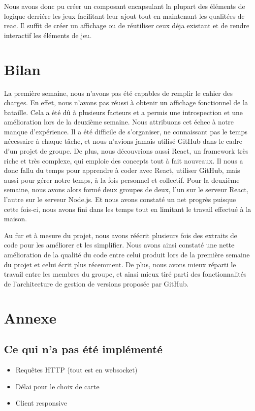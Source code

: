 \documentclass[a4paper]{article}
\begin{document}
Nous avons donc pu créer un composant encapsulant la plupart des éléments de logique derriére les jeux facilitant leur ajout tout en maintenant les qualitées de reac. Il suffit de créer un affichage ou de réutiliser ceux déja existant et de rendre interactif les éléments de jeu.





\section{Bilan}

La première semaine, nous n'avons pas été capables de remplir le cahier des charges. En effet, nous n'avons pas réussi à obtenir un affichage fonctionnel de la bataille. Cela a été dû à plusieurs facteurs et a permis une introspection et une amélioration lors de la deuxième semaine. Nous attribuons cet échec à notre manque d'expérience. Il a été difficile de s'organiser, ne connaissant pas le temps nécessaire à chaque tâche, et nous n'avions jamais utilisé GitHub dans le cadre d'un projet de groupe. De plus, nous découvrions aussi React, un framework très riche et très complexe, qui emploie des concepts tout à fait nouveaux. Il nous a donc fallu du temps pour apprendre à coder avec React, utiliser GitHub, mais aussi pour gérer notre temps, à la fois personnel et collectif. Pour la deuxième semaine, nous avons alors formé deux groupes de deux, l'un sur le serveur React, l'autre sur le serveur Node.js. Et nous avons constaté un net progrès puisque cette fois-ci, nous avons fini dans les temps tout en limitant le travail effectué à la maison.

Au fur et à mesure du projet, nous avons réécrit plusieurs fois des extraits de code pour les améliorer et les simplifier. Nous avons ainsi constaté une nette amélioration de la qualité du code entre celui produit lors de la première semaine du projet et celui écrit plus récemment. De plus, nous avons mieux réparti le travail entre les membres du groupe, et ainsi mieux tiré parti des fonctionnalités de l'architecture de gestion de versions proposée par GitHub.

\newpage
\section{Annexe}
\subsection{Ce qui n'a pas été implémenté}
\begin{itemize}
    \item Requêtes HTTP (tout est en websocket)
    \item Délai pour le choix de carte
    \item Client responsive
\end{itemize}
\end{document}
